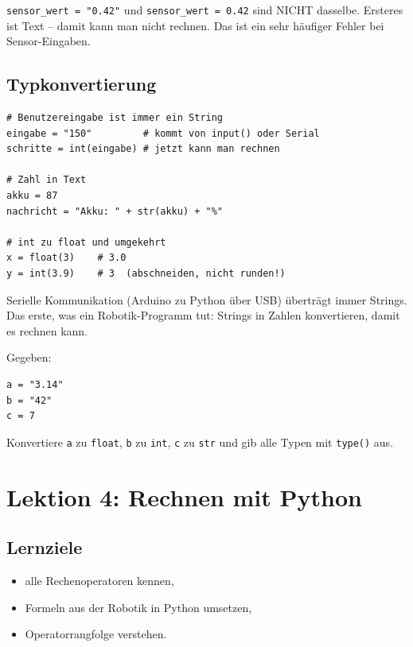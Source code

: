 \begin{merksatz}
\texttt{sensor\_wert = "0.42"} und \texttt{sensor\_wert = 0.42} sind NICHT dasselbe. Ersteres ist Text -- damit kann man nicht rechnen. Das ist ein sehr häufiger Fehler bei Sensor-Eingaben.
\end{merksatz}

\subsection*{Typkonvertierung}

\begin{lstlisting}
# Benutzereingabe ist immer ein String
eingabe = "150"         # kommt von input() oder Serial
schritte = int(eingabe) # jetzt kann man rechnen

# Zahl in Text
akku = 87
nachricht = "Akku: " + str(akku) + "%"

# int zu float und umgekehrt
x = float(3)    # 3.0
y = int(3.9)    # 3  (abschneiden, nicht runden!)
\end{lstlisting}

\begin{praxis}
Serielle Kommunikation (Arduino zu Python über USB) überträgt immer Strings. Das erste, was ein Robotik-Programm tut: Strings in Zahlen konvertieren, damit es rechnen kann.
\end{praxis}

\begin{uebung}[title=Übung 1.3: Typen bestimmen und konvertieren]
Gegeben:
\begin{lstlisting}
a = "3.14"
b = "42"
c = 7
\end{lstlisting}
Konvertiere \texttt{a} zu \texttt{float}, \texttt{b} zu \texttt{int}, \texttt{c} zu \texttt{str} und gib alle Typen mit \texttt{type()} aus.
\end{uebung}

\section{Lektion 4: Rechnen mit Python}

\subsection*{Lernziele}
\begin{itemize}
    \item alle Rechenoperatoren kennen,
    \item Formeln aus der Robotik in Python umsetzen,
    \item Operatorrangfolge verstehen.
\end{itemize}

